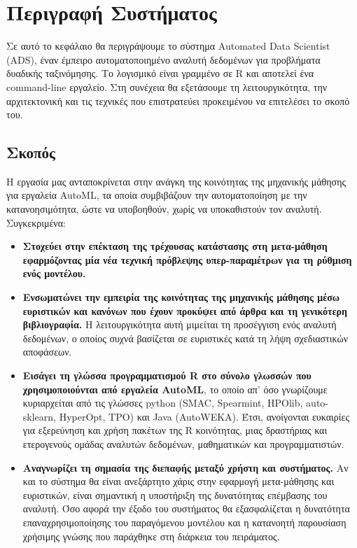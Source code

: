 \chapter{Περιγραφή Συστήματος}
Σε αυτό το κεφάλαιο θα περιγράψουμε το σύστημα Automated Data Scientist (ADS), έναν έμπειρο αυτοματοποιημένο αναλυτή δεδομένων για προβλήματα δυαδικής ταξινόμησης. Το λογισμικό είναι γραμμένο σε R και αποτελεί ένα command-line εργαλείο. Στη συνέχεια θα εξετάσουμε τη λειτουργικότητα, την αρχιτεκτονική και τις τεχνικές που επιστρατεύει προκειμένου να επιτελέσει το σκοπό του.
\section{Σκοπός}
Η εργασία μας ανταποκρίνεται στην ανάγκη της κοινότητας της μηχανικής μάθησης για εργαλεία AutoML, τα οποία συμβιβάζουν την αυτοματοποίηση με την κατανοησιμότητα, ώστε να υποβοηθούν, χωρίς να υποκαθιστούν τον αναλυτή. Συγκεκριμένα:
\begin{itemize}
	\item \textbf{Στοχεύει στην επέκταση της τρέχουσας κατάστασης στη μετα-μάθηση εφαρμόζοντας μία νέα τεχνική πρόβλεψης υπερ-παραμέτρων για τη ρύθμιση ενός μοντέλου.}
	\item  \textbf{Ενσωματώνει την εμπειρία της κοινότητας της μηχανικής μάθησης μέσω ευριστικών και κανόνων που έχουν προκύψει από άρθρα και τη γενικότερη βιβλιογραφία.} Η λειτουργικότητα αυτή μιμείται τη προσέγγιση ενός αναλυτή δεδομένων, ο οποίος συχνά βασίζεται σε ευριστικές κατά τη λήψη σχεδιαστικών αποφάσεων.
	\item \textbf{Εισάγει τη γλώσσα προγραμματισμού R στο σύνολο γλωσσών που χρησιμοποιούνται από εργαλεία AutoML}, το οποίο απ' όσο γνωρίζουμε κυριαρχείται από τις γλώσσες python (SMAC, Spearmint, HPOlib, auto-sklearn, HyperOpt, TPO) και Java (AutoWEKA). Έτσι, ανοίγονται ευκαιρίες για εξερεύνηση και χρήση πακέτων της R κοινότητας, μιας δραστήριας και ετερογενούς ομάδας αναλυτών δεδομένων, μαθηματικών και προγραμματιστών.
	\item \textbf{Αναγνωρίζει τη σημασία της διεπαφής μεταξύ χρήστη και συστήματος.} Αν και το σύστημα θα είναι ανεξάρτητο χάρις στην εφαρμογή μετα-μάθησης και ευριστικών, είναι σημαντική η υποστήριξη της δυνατότητας επέμβασης του αναλυτή. Όσο αφορά την έξοδο του συστήματος θα εξασφαλίζεται η δυνατότητα επαναχρησιμοποίησης του παραγόμενου μοντέλου και η  κατανοητή παρουσίαση χρήσιμης γνώσης που παράχθηκε στη διάρκεια του πειράματος. 
\end{itemize} 

